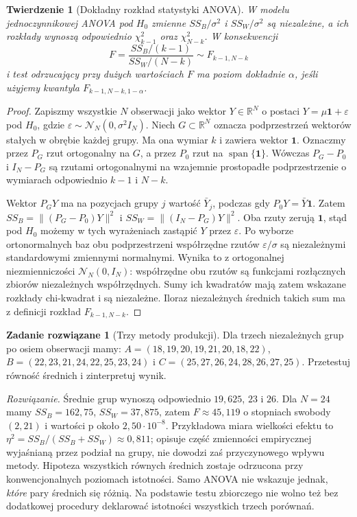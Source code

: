 \documentclass[11pt,a4paper,oneside]{report}
\numberwithin{equation}{chapter}
\theoremstyle{plain}
\newtheorem{twierdzenie}{Twierdzenie}[chapter]
\theoremstyle{definition}
\newtheorem{zadanie}{Zadanie rozwiązane}[chapter]
\theoremstyle{remark}
\newcommand{\R}{\mathbb R}
\newcommand{\Normal}{\mathcal N}
\begin{document}
\begin{twierdzenie}[Dokładny rozkład statystyki ANOVA]
\label{thm:anova-f}
W modelu jednoczynnikowej ANOVA pod $H_0$ zmienne
$SS_B/\sigma^2$ i $SS_W/\sigma^2$ są niezależne,
a ich rozkłady wynoszą odpowiednio $\chi^2_{k-1}$
oraz $\chi^2_{N-k}$. W konsekwencji
\[
 F=\frac{SS_B/(k-1)}{SS_W/(N-k)}\sim F_{k-1,N-k}
\]
i test odrzucający przy dużych wartościach $F$ ma
poziom dokładnie $\alpha$, jeśli użyjemy kwantyla
$F_{k-1,N-k,1-\alpha}$.
\end{twierdzenie}
\begin{proof}
Zapiszmy wszystkie $N$ obserwacji jako wektor
$Y\in\R^N$ o postaci $Y=\mu\mathbf1+\varepsilon$
pod $H_0$, gdzie $\varepsilon\sim\Normal_N(0,\sigma^2I_N)$.
Niech $G\subset\R^N$ oznacza podprzestrzeń wektorów
stałych w obrębie każdej grupy. Ma ona wymiar $k$ i zawiera
wektor $\mathbf1$. Oznaczmy przez $P_G$ rzut
ortogonalny na $G$, a przez $P_0$ rzut na
$\operatorname{span}\{\mathbf1\}$. Wówczas
$P_G-P_0$ i $I_N-P_G$ są rzutami ortogonalnymi na
wzajemnie prostopadłe podprzestrzenie o wymiarach
odpowiednio $k-1$ i $N-k$.

Wektor $P_GY$ ma na pozycjach grupy $j$ wartość
$\bar Y_j$, podczas gdy $P_0Y=\bar Y\mathbf1$.
Zatem $SS_B=\|(P_G-P_0)Y\|^2$ i
$SS_W=\|(I_N-P_G)Y\|^2$.
Oba rzuty zerują $\mathbf1$, stąd pod $H_0$ możemy w tych
wyrażeniach zastąpić $Y$ przez $\varepsilon$.
Po wyborze ortonormalnych baz obu podprzestrzeni
współrzędne rzutów $\varepsilon/\sigma$ są niezależnymi
standardowymi zmiennymi normalnymi. Wynika to z
ortogonalnej niezmienniczości $\Normal_N(0,I_N)$:
współrzędne obu rzutów są funkcjami rozłącznych zbiorów
niezależnych współrzędnych. Sumy ich kwadratów mają
zatem wskazane rozkłady chi-kwadrat i są niezależne.
Iloraz niezależnych średnich takich sum ma z definicji
rozkład $F_{k-1,N-k}$.
\end{proof}

\begin{zadanie}[Trzy metody produkcji]\label{zad:anova-three}
Dla trzech niezależnych grup po osiem obserwacji mamy:
$A=(18,19,20,19,21,20,18,22)$,
$B=(22,23,21,24,22,25,23,24)$ i
$C=(25,27,26,24,28,26,27,25)$.
Przetestuj równość średnich i zinterpretuj wynik.
\par\emph{Rozwiązanie.} Średnie grup wynoszą odpowiednio
$19{,}625$, $23$ i $26$. Dla $N=24$ mamy $SS_B=162{,}75$, $SS_W=37{,}875$,
zatem $F\approx45{,}119$ o stopniach swobody $(2,21)$ i
wartości p około $2{,}50\cdot10^{-8}$.
Przykładowa miara wielkości efektu to
$\eta^2=SS_B/(SS_B+SS_W)\approx0{,}811$; opisuje część
zmienności empirycznej wyjaśnianą przez podział na grupy,
nie dowodzi zaś przyczynowego wpływu metody.
Hipoteza wszystkich równych średnich zostaje odrzucona przy
konwencjonalnych poziomach istotności. Samo ANOVA nie
wskazuje jednak, \emph{które} pary średnich się różnią.
Na podstawie testu zbiorczego nie wolno też bez dodatkowej
procedury deklarować istotności wszystkich trzech porównań.
\end{zadanie}
\end{document}
